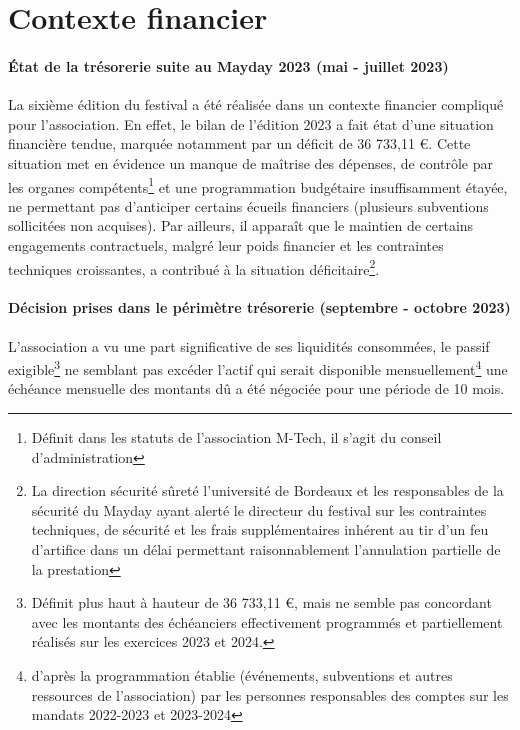 \documentclass[12pt,a4paper]{report}
\begin{document}
\section*{Contexte financier}
\paragraph*{État de la trésorerie suite au Mayday 2023 (mai - juillet 2023)}
La sixième édition du festival a été réalisée dans un contexte financier compliqué pour l’association. En effet, le bilan de l'édition 2023 a fait état d'une situation financière tendue, marquée notamment par un déficit de 36 733,11 €. Cette situation met en évidence un manque de maîtrise des dépenses, de contrôle par les organes compétents\footnote{Définit dans les statuts de l'association M-Tech, il s'agit du conseil d'administration} et une programmation budgétaire insuffisamment étayée, ne permettant pas d'anticiper certains écueils financiers (plusieurs subventions sollicitées non acquises). Par ailleurs, il apparaît que le maintien de certains engagements contractuels, malgré leur poids financier et les contraintes techniques croissantes, a contribué à la situation déficitaire\footnote{\sloppy La direction sécurité sûreté l'université de Bordeaux et les responsables de la sécurité du Mayday ayant alerté le directeur du festival sur les contraintes techniques, de sécurité et les frais supplémentaires inhérent au tir d'un feu d'artifice dans un délai permettant raisonnablement l'annulation partielle de la prestation}.

\paragraph*{Décision prises dans le périmètre trésorerie (septembre - octobre 2023)}
L'association a vu une part significative de ses liquidités consommées, le passif exigible\footnote{Définit plus haut à hauteur de 36 733,11 €, mais ne semble pas concordant avec les montants des échéanciers effectivement programmés et partiellement réalisés sur les exercices 2023 et 2024.} ne semblant pas excéder l'actif qui serait disponible mensuellement\footnote{d'après la programmation établie (événements, subventions et autres ressources de l'association) par les personnes responsables des comptes sur les mandats 2022-2023 et 2023-2024} une échéance mensuelle des montants dû a été négociée pour une période de 10 mois.
\end{document}
